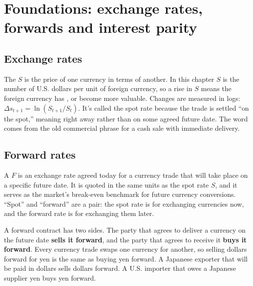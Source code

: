 \section{Foundations: exchange rates, forwards and interest parity}
\label{sec:06-foundations}

\subsection{Exchange rates}

The  $S$ is the price of one currency in terms of another. In this chapter $S$ is the number of U.S. dollars per unit of foreign currency, so a rise in $S$ means the foreign currency has , or become more valuable. Changes are measured in logs: $\Delta s_{t+1} = \ln(S_{t+1}/S_t)$.
It’s called the spot rate because the trade is settled “on the spot,” meaning right away rather than on some agreed future date. The word comes from the old commercial phrase for a cash sale with immediate delivery.



\subsection{Forward rates}

A  $F$ is an exchange rate agreed today for a currency trade that will take place on a specific future date. It is quoted in the same units as the spot rate $S$, and it serves as the market's break-even benchmark for future currency conversions.
“Spot” and “forward” are a pair: the spot rate is for exchanging currencies now, and the forward rate is for exchanging them later.

A forward contract has two sides. The party that agrees to deliver a currency on the future date \textbf{sells it forward}, and the party that agrees to receive it \textbf{buys it forward}. Every currency trade swaps one currency for another, so selling dollars forward for yen is the same as buying yen forward. A Japanese exporter that will be paid in dollars sells dollars forward. A U.S. importer that owes a Japanese supplier yen buys yen forward.

